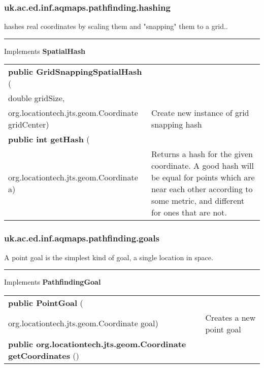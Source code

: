 \subsubsection{ uk.ac.ed.inf.aqmaps.pathfinding.hashing }
 { hashes real coordinates by scaling them and "snapping" them to a grid..
 
\vspace*{4pt} \hrule \vspace*{3pt}
Implements \textbf{ SpatialHash }
\begin{tabular}{ p{3in}|m{3.4in}}
\textbf{public GridSnappingSpatialHash } (\\ \hspace*{ 5pt} double gridSize,\\\hspace*{ 5pt} org.locationtech.jts.geom.Coordinate gridCenter) & Create new instance of grid snapping hash\\ \hline 
\textbf{public int getHash } (\\ \hspace*{ 5pt} org.locationtech.jts.geom.Coordinate a) & Returns a hash for the given coordinate. A good hash will be equal for points which are near each other\newline%
 according to some metric, and different for ones that are not.\\ \hline 
\end{tabular}
}
\subsubsection{ uk.ac.ed.inf.aqmaps.pathfinding.goals }
 { A point goal is the simplest kind of goal, a single location in space.
 
\vspace*{4pt} \hrule \vspace*{3pt}
Implements \textbf{ PathfindingGoal }
\begin{tabular}{ p{3in}|m{3.4in}}
\textbf{public PointGoal } (\\ \hspace*{ 5pt} org.locationtech.jts.geom.Coordinate goal) & Creates a new point goal\\ \hline 
\textbf{public org.locationtech.jts.geom.Coordinate getCoordinates} () & \\ \hline 
\end{tabular}
}
